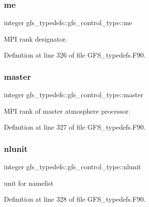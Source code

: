 \subsubsection{me}
{\footnotesize\ttfamily integer gfs\+\_\+typedefs\+::gfs\+\_\+control\+\_\+type\+::me}



M\+PI rank designator. 



Definition at line 326 of file G\+F\+S\+\_\+typedefs.\+F90.

\mbox{\label{structgfs__typedefs_1_1gfs__control__type_ac0fa9eaaf21734c14b46cd025951fdd1}} 
\subsubsection{master}
{\footnotesize\ttfamily integer gfs\+\_\+typedefs\+::gfs\+\_\+control\+\_\+type\+::master}



M\+PI rank of master atmosphere processor. 



Definition at line 327 of file G\+F\+S\+\_\+typedefs.\+F90.

\mbox{\label{structgfs__typedefs_1_1gfs__control__type_afa66754418045d25cc259ebf214f1baa}} 
\subsubsection{nlunit}
{\footnotesize\ttfamily integer gfs\+\_\+typedefs\+::gfs\+\_\+control\+\_\+type\+::nlunit}



unit for namelist 



Definition at line 328 of file G\+F\+S\+\_\+typedefs.\+F90.

\mbox{\label{structgfs__typedefs_1_1gfs__control__type_a5ff2c92403247c24c3612454cc40e2cd}} 
